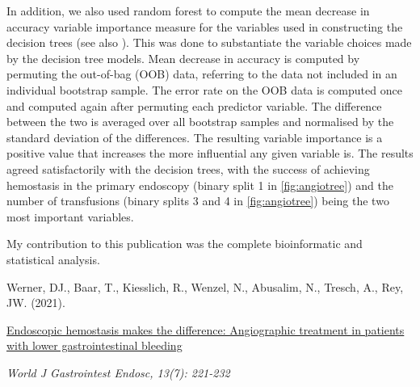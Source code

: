 \noindent
In addition, we also used random forest to compute the mean decrease in
accuracy variable importance measure for the variables used in constructing
the decision trees \citep{Han2016} (see also ). This
was done to substantiate the variable choices made by the decision tree
models. Mean decrease in accuracy is computed by permuting the out-of-bag (OOB)
data, referring to the data not included in an individual bootstrap sample.
The error rate on the OOB data is computed once and computed again after
permuting each predictor variable.  The difference between the two is averaged
over all bootstrap samples and normalised by the standard deviation of the
differences. The resulting variable importance is a positive value that
increases the more influential any given variable is. The results agreed
satisfactorily with the decision trees, with the success of achieving
hemostasis in the primary endoscopy (binary split 1 in \cref{fig:angiotree})
and the number of transfusions (binary splits 3 and 4 in \cref{fig:angiotree})
being the two most important variables.

\vfill
\noindent My contribution to this publication was the complete bioinformatic
and statistical analysis.\nopagebreak
\medskip
\begin{tcolorbox}[
  boxrule=0pt, leftrule=1pt, colframe=s-blue, colback=white, sharp corners=all]%
  \raggedright
  Werner, DJ., Baar, T., Kiesslich, R., Wenzel, N., Abusalim, N., Tresch, A.,
  Rey, JW. (2021).
  
  \smallskip
  \href{https://www.wjgnet.com/1948-5190/full/v13/i7/221.htm}
    {Endoscopic hemostasis makes the difference: Angiographic treatment in
    patients with lower gastrointestinal bleeding}

  \smallskip
  \textit{World J Gastrointest Endosc, 13(7): 221-232}
\end{tcolorbox}


% 

